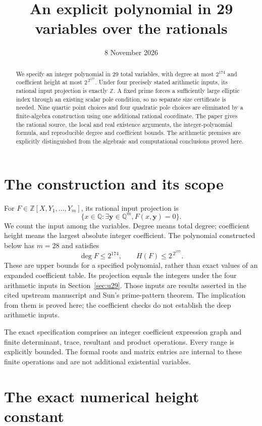 \documentclass[11pt,a4paper]{article}
\title{An explicit polynomial in 29 variables over the rationals}
\author{}
\date{8 November 2026}
\theoremstyle{definition}
\theoremstyle{remark}
\begin{document}
\maketitle
\begin{abstract}
We specify an integer polynomial in 29 total variables, with degree at
most $2^{174}$ and coefficient height at most $2^{\,2^{177}}$.
Under four precisely stated arithmetic inputs, its rational input
projection is exactly $\mathbb Z$. A fixed prime forces a sufficiently
large elliptic index through an existing scalar pole condition, so no
separate size certificate is needed. Nine quartic point choices and
four quadratic pole choices are eliminated by a finite-algebra
construction using one additional rational coordinate. The paper gives
the rational source, the local and real existence arguments, the
integer-polynomial formula, and reproducible degree and coefficient
bounds. The arithmetic premises are explicitly distinguished from the
algebraic and computational conclusions proved here.
\end{abstract}
\tableofcontents\newpage
\section{The construction and its scope}
For $F\in\mathbb Z[X,Y_1,\ldots,Y_m]$, its rational input projection is
\[
 \{x\in\mathbb Q:\exists\boldsymbol y\in\mathbb Q^m,
                         F(x,\boldsymbol y)=0\}.
\]
We count the input among the variables. Degree means total degree;
coefficient height means the largest absolute integer coefficient.
The polynomial constructed below has $m=28$ and satisfies
\[
                 \deg F\le2^{174},\qquad H(F)\le2^{\,2^{177}}.
\]
These are upper bounds for a specified polynomial, rather than exact
values of an expanded coefficient table. Its projection equals the
integers under the four arithmetic inputs in Section~\ref{sec:u29}.
Those inputs are results asserted in the cited upstream manuscript and
Sun's prime-pattern theorem. The implication from them is proved here;
the coefficient checks do not establish the deep arithmetic inputs.

The exact specification comprises an integer coefficient expression
graph and finite determinant, trace, resultant and product operations.
Every range is explicitly bounded. The formal roots and matrix entries
are internal to these finite operations and are not additional
existential variables.
\section{The exact numerical height constant}
\label{sec:exact-height-constant}
\end{document}
